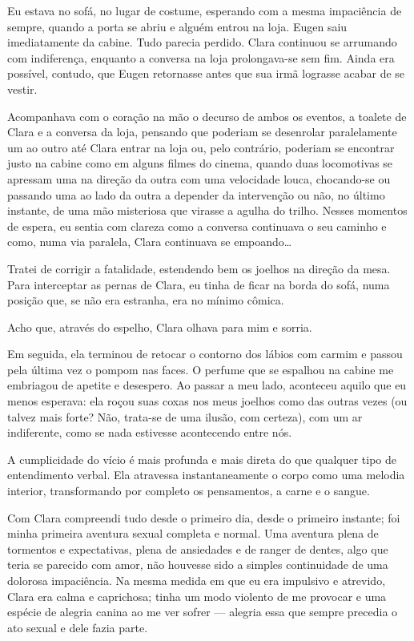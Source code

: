 Eu estava no sofá, no lugar de costume, esperando com a mesma impaciência de sempre, quando a porta se abriu e alguém entrou na loja. Eugen saiu imediatamente da cabine. Tudo parecia perdido. Clara continuou se arrumando com indiferença, enquanto a conversa na loja prolongava-se sem fim. Ainda era possível, contudo, que Eugen retornasse antes que sua irmã lograsse acabar de se vestir.

Acompanhava com o coração na mão o decurso de ambos os eventos, a toalete de Clara e a conversa da loja, pensando que poderiam se desenrolar paralelamente um ao outro até Clara entrar na loja ou, pelo contrário, poderiam se encontrar justo na cabine como em alguns filmes do cinema, quando duas locomotivas se apressam uma na direção da outra com uma velocidade louca, chocando-se ou passando uma ao lado da outra a depender da intervenção ou não, no último instante, de uma mão misteriosa que virasse a agulha do trilho. Nesses momentos de espera, eu sentia com clareza como a conversa continuava o seu caminho e como, numa via paralela, Clara continuava se empoando\ldots{}

Tratei de corrigir a fatalidade, estendendo bem os joelhos na direção da mesa. Para interceptar as pernas de Clara, eu tinha de ficar na borda do sofá, numa posição que, se não era estranha, era no mínimo cômica.

Acho que, através do espelho, Clara olhava para mim e sorria.

Em seguida, ela terminou de retocar o contorno dos lábios com carmim e passou pela última vez o pompom nas faces. O perfume que se espalhou na cabine me embriagou de apetite e desespero. Ao passar a meu lado, aconteceu aquilo que eu menos esperava: ela roçou suas coxas nos meus joelhos como das outras vezes (ou talvez mais forte? Não, trata-se de uma ilusão, com certeza), com um ar indiferente, como se nada estivesse acontecendo entre nós.

A cumplicidade do vício é mais profunda e mais direta do que qualquer tipo de entendimento verbal. Ela atravessa instantaneamente o corpo como uma melodia interior, transformando por completo os pensamentos, a carne e o sangue.


Com Clara compreendi tudo desde o primeiro dia, desde o primeiro instante; foi minha primeira aventura sexual completa e normal. Uma aventura plena de tormentos e expectativas, plena de ansiedades e de ranger de dentes, algo que teria se parecido com amor, não houvesse sido a simples continuidade de uma dolorosa impaciência. Na mesma medida em que eu era impulsivo e atrevido, Clara era calma e caprichosa; tinha um modo violento de me provocar e uma espécie de alegria canina ao me ver sofrer --- alegria essa que sempre precedia o ato sexual e dele fazia parte.

